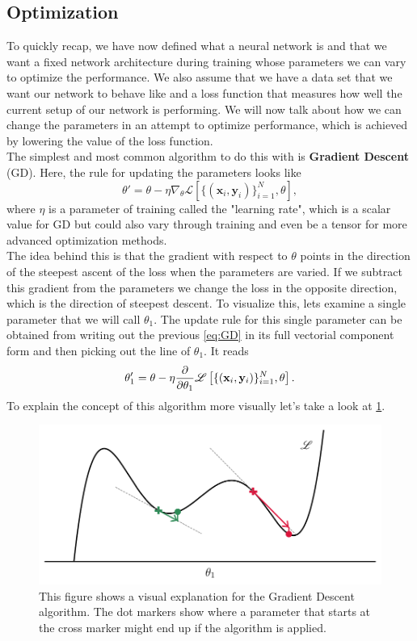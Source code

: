 \subsection{Optimization}\label{sec:NetworkOptimization}
To quickly recap, we have now defined what a neural network is and that we want a fixed network architecture during training whose parameters we can vary to optimize the performance. We also assume that we have a data set that we want our network to behave like and a loss function that measures how well the current setup of our network is performing. We will now talk about how we can change the parameters in an attempt to optimize performance, which is achieved by lowering the value of the loss function.\\
The simplest and most common algorithm to do this with is \textbf{Gradient Descent} (GD). Here, the rule for updating the parameters looks like 
\begin{equation}\label{eq:GD}
	\theta' = \theta - \eta \nabla_\theta \mathscr{L}\left[ \{(\mathbf{x}_i, \mathbf{y}_i)\}_{i=1}^{N}, \theta \right],
\end{equation}
where $\eta$ is a parameter of training called the "learning rate", which is a scalar value for GD but could also vary through training and even be a tensor for more advanced optimization methods.\\
The idea behind this is that the gradient with respect to $\theta$ points in the direction of the steepest ascent of the loss when the parameters are varied. If we subtract this gradient from the parameters we change the loss in the opposite direction, which is the direction of steepest descent. To visualize this, lets examine a single parameter that we will call $\theta_1$. The update rule for this single parameter can be obtained from writing out the previous \cref{eq:GD} in its full vectorial component form and then picking out the line of $\theta_1$. It reads
\begin{equation}
	\theta_1' = \theta - \eta \frac{\partial}{\partial\theta_1} \mathscr{L}\left[ \{(\mathbf{x}_i, \mathbf{y}_i)\}_{i=1}^{N}, \theta \right].
\end{equation}
To explain the concept of this algorithm more visually let's take a look at \cref{fig:gd_explanation_plot}. 
\begin{figure}
	\centering
	\includegraphics[width = 14cm]{text/MachineLearningBasics/plots/sgd_plot.pdf}
	\caption{This figure shows a visual explanation for the Gradient Descent algorithm. The dot markers show where a parameter that starts at the cross marker might end up if the algorithm is applied.}
	\label{fig:gd_explanation_plot}
\end{figure}

